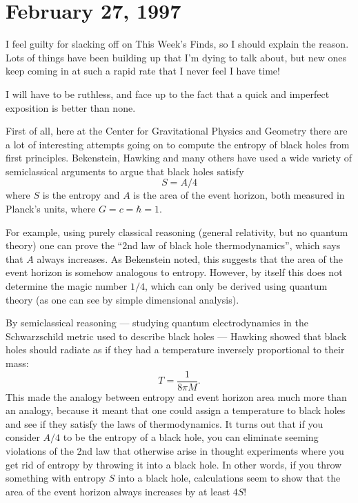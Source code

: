 \documentclass{article}
\begin{document}
\hypertarget{week98}{%
\section{February 27, 1997}\label{week98}}

I feel guilty for slacking off on This Week's Finds, so I should explain
the reason. Lots of things have been building up that I'm dying to talk
about, but new ones keep coming in at such a rapid rate that I never
feel I have time!

I will have to be ruthless, and face up to the fact that a quick and
imperfect exposition is better than none.

First of all, here at the Center for Gravitational Physics and Geometry
there are a lot of interesting attempts going on to compute the entropy
of black holes from first principles. Bekenstein, Hawking and many
others have used a wide variety of semiclassical arguments to argue that
black holes satisfy \[S = A/4\] where \(S\) is the entropy and \(A\) is
the area of the event horizon, both measured in Planck's units, where
\(G = c = \hbar = 1\).

For example, using purely classical reasoning (general relativity, but
no quantum theory) one can prove the ``2nd law of black hole
thermodynamics'', which says that \(A\) always increases. As Bekenstein
noted, this suggests that the area of the event horizon is somehow
analogous to entropy. However, by itself this does not determine the
magic number \(1/4\), which can only be derived using quantum theory (as
one can see by simple dimensional analysis).

By semiclassical reasoning --- studying quantum electrodynamics in the
Schwarzschild metric used to describe black holes --- Hawking showed
that black holes should radiate as if they had a temperature inversely
proportional to their mass: \[T = \frac{1}{8\pi M}.\] This made the
analogy between entropy and event horizon area much more than an
analogy, because it meant that one could assign a temperature to black
holes and see if they satisfy the laws of thermodynamics. It turns out
that if you consider \(A/4\) to be the entropy of a black hole, you can
eliminate seeming violations of the 2nd law that otherwise arise in
thought experiments where you get rid of entropy by throwing it into a
black hole. In other words, if you throw something with entropy \(S\)
into a black hole, calculations seem to show that the area of the event
horizon always increases by at least \(4S\)!
\end{document}
